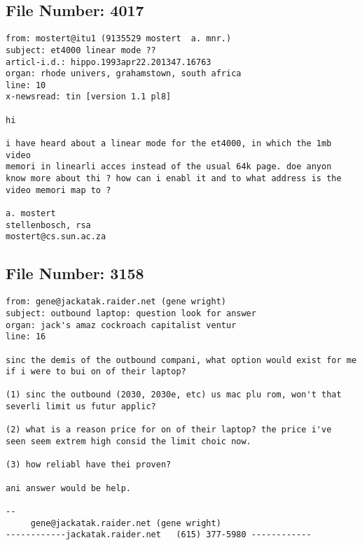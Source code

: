 \subsection{File Number: 4017}
\begin{verbatim}
from: mostert@itu1 (9135529 mostert  a. mnr.)
subject: et4000 linear mode ??
articl-i.d.: hippo.1993apr22.201347.16763
organ: rhode univers, grahamstown, south africa
line: 10
x-newsread: tin [version 1.1 pl8]

hi 

i have heard about a linear mode for the et4000, in which the 1mb video 
memori in linearli acces instead of the usual 64k page. doe anyon
know more about thi ? how can i enabl it and to what address is the
video memori map to ?

a. mostert
stellenbosch, rsa
mostert@cs.sun.ac.za
\end{verbatim}
\subsection{File Number: 3158}
\begin{verbatim}
from: gene@jackatak.raider.net (gene wright)
subject: outbound laptop: question look for answer
organ: jack's amaz cockroach capitalist ventur
line: 16

sinc the demis of the outbound compani, what option would exist for me 
if i were to bui on of their laptop? 

(1) sinc the outbound (2030, 2030e, etc) us mac plu rom, won't that 
severli limit us futur applic?

(2) what is a reason price for on of their laptop? the price i've 
seen seem extrem high consid the limit choic now.

(3) how reliabl have thei proven?

ani answer would be help.

--
     gene@jackatak.raider.net (gene wright)
------------jackatak.raider.net   (615) 377-5980 ------------
\end{verbatim}
